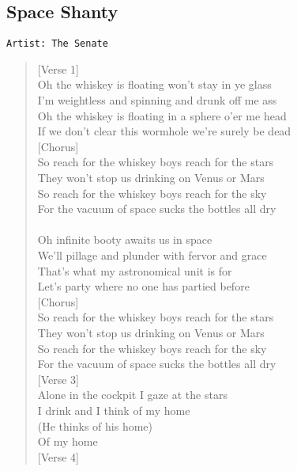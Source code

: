 \documentclass[11pt]{article}
\begin{document}
\subsection{Space Shanty}
\label{sec:org4264951}
\begin{verbatim}
Artist: The Senate
\end{verbatim}
\begin{verse}
[Verse 1]\\
Oh the whiskey is floating won't stay in ye glass\\
I'm weightless and spinning and drunk off me ass\\
Oh the whiskey is floating in a sphere o'er me head\\
If we don't clear this wormhole we're surely be dead\\
\vspace*{1em}
[Chorus]\\
So reach for the whiskey boys reach for the stars\\
They won't stop us drinking on Venus or Mars\\
So reach for the whiskey boys reach for the sky\\
For the vacuum of space sucks the bottles all dry\\
[Verse 2]\\
Oh infinite booty awaits us in space\\
We'll pillage and plunder with fervor and grace\\
That's what my astronomical unit is for\\
Let's party where no one has partied before\\
\vspace*{1em}
[Chorus]\\
So reach for the whiskey boys reach for the stars\\
They won't stop us drinking on Venus or Mars\\
So reach for the whiskey boys reach for the sky\\
For the vacuum of space sucks the bottles all dry\\
\vspace*{1em}
[Verse 3]\\
Alone in the cockpit I gaze at the stars\\
I drink and I think of my home\\
(He thinks of his home)\\
Of my home\\
\vspace*{1em}
[Verse 4]\\

\end{verse}
\end{document}
